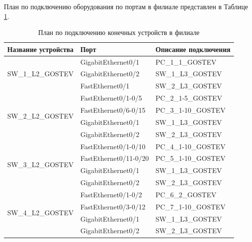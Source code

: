 \documentclass[14pt, a4paper]{extarticle}
\numberwithin{equation}{section}
\begin{document}
План по подключению оборудования по портам в филиале представлен в Таблице \ref{table:filialConnectionPlan}.
\begin{table}[H]
\small
\centering
\caption{План по подключению конечных устройств в филиале}
\label{table:filialConnectionPlan}
\begin{tabular}{|l|l|l|}
\hline
\textbf{Название устройства}       & \textbf{Порт}          & \textbf{Описание подключения} \\ \hline
\multirow{3}{*}{SW\_1\_L2\_GOSTEV} & GigabitEthernet0/1     & PC\_1\_1\_GOSTEV              \\ \cline{2-3} 
                                   & GigabitEthernet0/2     & SW\_1\_L3\_GOSTEV             \\ \cline{2-3} 
                                   & FastEthernet0/1        & SW\_2\_L3\_GOSTEV             \\ \hline
\multirow{4}{*}{SW\_2\_L2\_GOSTEV} & FastEthernet0/1-0/5    & PC\_2\_1-5\_GOSTEV            \\ \cline{2-3} 
                                   & FastEthernet0/6-0/15   & PC\_3\_1-10\_GOSTEV           \\ \cline{2-3} 
                                   & GigabitEthernet0/1     & SW\_1\_L3\_GOSTEV             \\ \cline{2-3} 
                                   & GigabitEthernet0/2     & SW\_2\_L3\_GOSTEV             \\ \hline
\multirow{4}{*}{SW\_3\_L2\_GOSTEV} & FastEthernet0/1-0/10   & PC\_4\_1-10\_GOSTEV           \\ \cline{2-3} 
                                   & FastEthernet0/11-0/20  & PC\_5\_1-10\_GOSTEV           \\ \cline{2-3} 
                                   & GigabitEthernet0/1     & SW\_1\_L3\_GOSTEV             \\ \cline{2-3} 
                                   & GigabitEthernet0/2     & SW\_2\_L3\_GOSTEV             \\ \hline
\multirow{4}{*}{SW\_4\_L2\_GOSTEV} & FastEthernet0/1-0/2    & PC\_6\_2\_GOSTEV              \\ \cline{2-3} 
                                   & FastEthernet0/3-0/12   & PC\_7\_1-10\_GOSTEV           \\ \cline{2-3} 
                                   & GigabitEthernet0/1     & SW\_1\_L3\_GOSTEV             \\ \cline{2-3} 
                                   & GigabitEthernet0/2     & SW\_2\_L3\_GOSTEV             \\ \hline

\end{tabular}
\end{table}
\end{document}
